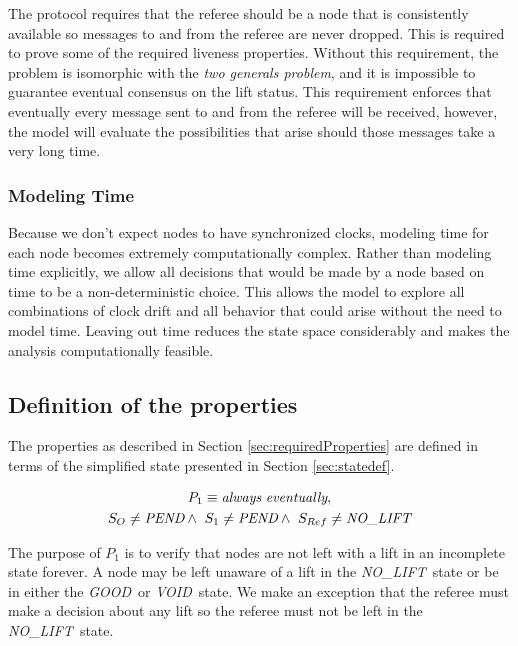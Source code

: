 \documentclass[runningheads]{llncs}
\newcommand{\originatorstate}{S_O}
\newcommand{\relayastate}{S_1}
\newcommand{\refstate}{S_{Ref}}
\newcommand{\nolift}{\emph{NO\_LIFT}}
\newcommand{\pend}{\emph{PEND}}
\newcommand{\void}{\emph{VOID}}
\newcommand{\good}{\emph{GOOD}}
\newcommand{\always}{\emph{always}}
\newcommand{\eventually}{\emph{eventually}}
\newcommand{\secref}[1]{Section \ref{#1}}
\newif\ifcomments
\newif\ifkylecomments
\newcommand{\egm}[1]{\ifcomments\textcolor{orange}{egm: #1}\fi}
\newcommand{\krs}[1]{\ifkylecomments\textcolor{blue}{krs: #1}\fi}
\begin{document}
The protocol requires that the referee should be a node that is consistently available so messages to and from the referee are never dropped. This is required to prove some of the required liveness properties. Without this requirement, the problem is isomorphic with the \emph{two generals problem}, and it is impossible to guarantee eventual consensus on the lift status. This requirement enforces that eventually every message sent to and from the referee will be received, however, the model will evaluate the possibilities that arise should those messages take a very long time. 

\subsubsection{Modeling Time}
\label{sec:model_time}
Because we don't expect nodes to have synchronized clocks, modeling time for each node becomes extremely computationally complex. Rather than modeling time explicitly, we allow all decisions that would be made by a node based on time to be a non-deterministic choice. This allows the model to explore all combinations of clock drift and all behavior that could arise without the need to model time. Leaving out time reduces the state space considerably and makes the analysis computationally feasible. 

\subsection{Definition of the properties}
\krs{Very nice. Got a big list of latex macros now \egm{The following is an example of why the \emph{secref} macro is useful. Here section is lowercase and I think previously it was uppercase}.}
The properties as described in \secref{sec:requiredProperties} are defined in terms of the simplified state presented in \secref{sec:statedef}. 

\begin{definition}[Property 1]
\begin{multline*}
    P_1 \equiv \always\ \eventually,\\
    \originatorstate \neq \pend \wedge\ \relayastate \neq \pend \wedge\ \refstate \neq \nolift\\
\end{multline*}
\end{definition}
The purpose of $P_1$ is to verify that nodes are not left with a lift in an incomplete state forever. A node may be left unaware of a lift in the \nolift\ state or be in either the \good\ or \void\ state. We make an exception that the referee must make a decision about any lift so the referee must not be left in the \nolift\ state. 
\end{document}
